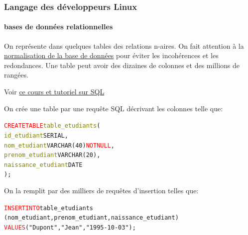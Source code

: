 \documentclass[xcolor=svgnames,final,smaller,a4]{beamer}
\begin{document}
\begin{frame}
  \frametitle{Langage des développeurs Linux}
  \framesubtitle{bases de données relationnelles}

On représente dans quelques tables des relations n-aires. On fait
attention à la
\href{https://en.wikipedia.org/wiki/Database_normalization}{normalisation
  de la base de données} pour éviter les incohérences et les
redondances. Une table peut avoir des dizaines de colonnes et des
millions de rangées.

Voir \href{https://sql.sh/}{ce cours et tutoriel sur SQL}

On crée une table par une requête SQL décrivant les colonnes telle que:

\begin{relsize}{-1}
\begin{alltt}
  \textcolor{red}{CREATE TABLE} \textcolor{Olive}{table\_etudiants} (\\
  \hspace{0.5cm} \textcolor{Olive}{id\_etudiant} SERIAL,\\
  \hspace{0.5cm} \textcolor{Olive}{nom\_etudiant} VARCHAR(40)  \textcolor{red}{NOT NULL},\\
  \hspace{0.5cm} \textcolor{Olive}{prenom\_etudiant} VARCHAR(20),\\
  \hspace{0.5cm} \textcolor{Olive}{naissance\_etudiant} DATE\\
   );
\end{alltt}
\end{relsize}

On la remplit par des milliers de requêtes d'insertion telles que:
\begin{relsize}{-1}
\begin{alltt}
  \textcolor{red}{INSERT INTO} table\_etudiants\\
  \hspace{0.5cm} (nom\_etudiant, prenom\_etudiant, naissance\_etudiant)\\
  \textcolor{red}{VALUES} ("Dupont", "Jean", "1995-10-03");
\end{alltt}
\end{relsize}

\end{frame}
\end{document}
